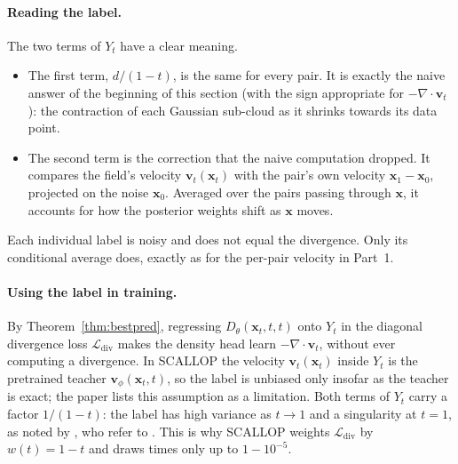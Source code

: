 \documentclass[11pt,a4paper]{article}
\numberwithin{equation}{section}     %
\theoremstyle{plain}        %
\theoremstyle{definition}   %
\theoremstyle{remark}       %
\begin{document}
\paragraph{Reading the label.} The two terms of $Y_t$ have a clear meaning.
\begin{itemize}
\item The first term, $d/(1-t)$, is the same for every pair. It is exactly the naive answer of the beginning of this section (with the sign appropriate for $-\nabla\cdot\mathbf{v}_t$): the contraction of each Gaussian sub-cloud as it shrinks towards its data point.
\item The second term is the correction that the naive computation dropped. It compares the field's velocity $\mathbf{v}_t(\mathbf{x}_t)$ with the pair's own velocity $\mathbf{x}_1-\mathbf{x}_0$, projected on the noise $\mathbf{x}_0$. Averaged over the pairs passing through $\mathbf{x}$, it accounts for how the posterior weights shift as $\mathbf{x}$ moves.
\end{itemize}
Each individual label is noisy and does not equal the divergence. Only its conditional average does, exactly as for the per-pair velocity in Part~1.

\paragraph{Using the label in training.} By Theorem~\ref{thm:bestpred}, regressing $D_\theta(\mathbf{x}_t,t,t)$ onto $Y_t$ in the diagonal divergence loss $\mathcal{L}_{\mathrm{div}}$ makes the density head learn $-\nabla\cdot\mathbf{v}_t$, without ever computing a divergence. In SCALLOP the velocity $\mathbf{v}_t(\mathbf{x}_t)$ inside $Y_t$ is the pretrained teacher $\mathbf{v}_\phi(\mathbf{x}_t,t)$, so the label is unbiased only insofar as the teacher is exact; the paper lists this assumption as a limitation. Both terms of $Y_t$ carry a factor $1/(1-t)$: the label has high variance as $t\to1$ and a singularity at $t=1$, as noted by \citet{ouyang2026}, who refer to \citet{song2021}. This is why SCALLOP weights $\mathcal{L}_{\mathrm{div}}$ by $w(t)=1-t$ and draws times only up to $1-10^{-5}$.
\end{document}

